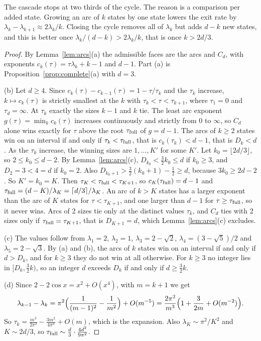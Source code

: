 The cascade stops at two thirds of the cycle. The reason is a comparison per
added state. Growing an arc of $k$ states by one state lowers the exit rate by
$\lambda_k-\lambda_{k+1}\approx2\lambda_k/k$. Closing the cycle removes all of
$\lambda_k$ but adds $d-k$ new states, and this is better once
$\lambda_k/(d-k)>2\lambda_k/k$, that is once $k>2d/3$.

\begin{proof}
By Lemma~\ref{lem:arcs}(a) the admissible faces are the arcs and $C_d$, with
exponents $c_k(\tau)=\tau\lambda_k+k-1$ and $d-1$. Part (a) is
Proposition~\ref{prop:complete}(a) with $d=3$.

(b) Let $d\ge4$. Since $c_k(\tau)-c_{k-1}(\tau)=1-\tau/\tau_k$ and the $\tau_k$
increase, $k\mapsto c_k(\tau)$ is strictly smallest at the $k$ with
$\tau_k<\tau<\tau_{k+1}$, where $\tau_1=0$ and $\tau_d=\infty$. At $\tau_k$
exactly the sizes $k-1$ and $k$ tie. The least arc exponent
$g(\tau)=\min_kc_k(\tau)$ increases continuously and strictly from $0$ to
$\infty$, so $C_d$ alone wins exactly for $\tau$ above the root
$\tau_{\rm full}$ of $g=d-1$. The arcs of $k\ge2$ states
win on an interval if and only if $\tau_k<\tau_{\rm full}$, that is
$c_k(\tau_k)<d-1$, that is $D_k<d$. As the $\tau_k$ increase, the winning sizes
are $1,\dots,K'$ for some $K'$. Let $k_0=\lfloor2d/3\rfloor$, so $2\le k_0\le
d-2$. By Lemma~\ref{lem:arcs}(c), $D_{k_0}<\frac32k_0\le d$ if $k_0\ge3$, and
$D_2=3<4=d$ if $k_0=2$. Also $D_{k_0+1}>\frac32(k_0+1)-\frac12\ge d$, because
$3k_0\ge2d-2$. So $K'=k_0=K$. Then $\tau_K<\tau_{\rm full}<\tau_{K+1}$, so
$c_K(\tau_{\rm full})=d-1$ and $\tau_{\rm full}=(d-K)/\lambda_K=\lceil
d/3\rceil/\lambda_K$. An arc of $k>K$ states has a larger exponent than the
arc of $K$ states for $\tau<\tau_{K+1}$, and one larger than $d-1$ for
$\tau\ge\tau_{\rm full}$, so it never wins. Arcs of 2 sizes tie only at the
distinct values $\tau_k$, and $C_d$ ties with 2 sizes only if $\tau_{\rm full}=\tau_{K+1}$, that is
$D_{K+1}=d$, which Lemma~\ref{lem:arcs}(c) excludes.

(c) The values follow from $\lambda_1=2$, $\lambda_2=1$, $\lambda_3=2-\sqrt2$,
$\lambda_4=(3-\sqrt5)/2$ and $\lambda_5=2-\sqrt3$. By (a) and (b), the arcs of
$k$ states win on an interval if and only if $d>D_k$, and for $k\ge3$ they do
not win at all otherwise. For $k\ge3$ no integer lies in $[D_k,\frac32k)$, so an
integer $d$ exceeds $D_k$ if and only if $d\ge\frac32k$.

(d) Since $2-2\cos x=x^2+O(x^4)$, with $m=k+1$ we get
\[
\lambda_{k-1}-\lambda_k=\pi^2\Bigl(\frac1{(m-1)^2}-\frac1{m^2}\Bigr)+O(m^{-5})
=\frac{2\pi^2}{m^3}\Bigl(1+\frac3{2m}+O(m^{-2})\Bigr).
\]
So $\tau_k=\frac{m^3}{2\pi^2}-\frac{3m^2}{4\pi^2}+O(m)$, which is the
expansion. Also $\lambda_K\sim\pi^2/K^2$ and $K\sim2d/3$, so $\tau_{\rm
full}\sim\frac d3\cdot\frac{4d^2}{9\pi^2}$.
\end{proof}


